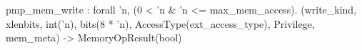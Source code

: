 pmp_mem_write : forall 'n, (0 < 'n & 'n <= max_mem_access).
  (write_kind, xlenbits, int('n), bits(8 * 'n), AccessType(ext_access_type), Privilege, mem_meta) -> MemoryOpResult(bool)